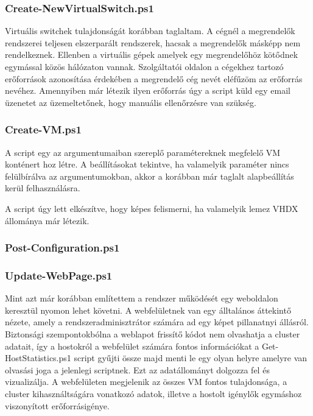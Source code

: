 \documentclass[12pt,oneside,justify,table]{book}
\begin{document}

\subsubsection{Create-NewVirtualSwitch.ps1}

Virtuális switchek tulajdonságát korábban taglaltam. A cégnél a megrendelők rendszerei teljesen elszerparált rendszerek, hacsak a megrendelők másképp nem rendelkeznek. Ellenben a virtuális gépek amelyek egy megrendelőhöz kötődnek egymással közös hálózaton vannak. Szolgáltatói oldalon a cégekhez tartozó erőforrások azonosítása érdekében a megrendelő cég nevét eléfűzöm az erőforrás nevéhez. Amennyiben már létezik ilyen erőforrás úgy a script küld egy email üzenetet az üzemeltetőnek, hogy manuális ellenőrzésre van szükség.


\subsubsection{Create-VM.ps1}

A script egy az argumentumaiban szereplő paramétereknek megfelelő VM konténert hoz létre. A beállításokat tekintve, ha valamelyik paraméter nincs felülbírálva az argumentumokban, akkor a korábban már taglalt alapbeállítás kerül felhasználásra.

A script úgy lett elkészítve, hogy képes felismerni, ha valamelyik lemez VHDX állománya már létezik.






\subsubsection{Post-Configuration.ps1}

\subsubsection{Update-WebPage.ps1}
Mint azt már korábban említettem a rendszer működését egy weboldalon keresztül nyomon lehet követni. A webfelületnek van egy álltalános áttekintő nézete, amely a rendszeradminisztrátor számára ad egy képet pillanatnyi állásról. 
Biztonsági szempontokbólna a weblapot frissítő kódot nem olvashatja a cluster adatait, így a hostokról a webfelület számára fontos információkat a Get-HostStatistics.ps1 script gyűjti össze majd menti le egy olyan helyre amelyre van olvasási joga a jelenlegi scriptnek. Ezt az adatállományt dolgozza fel és vizualizálja. A webfelületen megjelenik az összes VM fontos tulajdonsága, a cluster kihasználtságára vonatkozó adatok, illetve a hostolt igénylők egymáshoz viszonyított erőforrásigénye.
\end{document}
